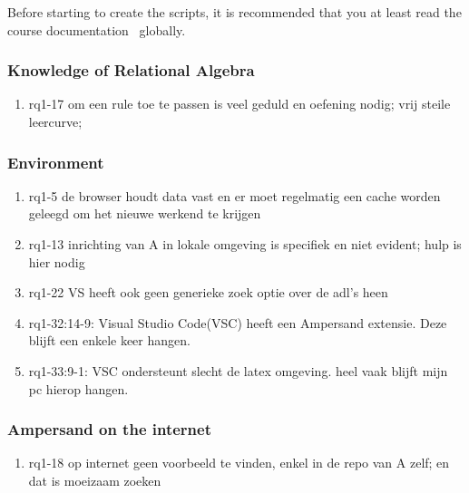 Before starting to create the scripts, it is recommended that you at least read the course documentation~ globally.



\subsubsection{Knowledge of Relational Algebra}
\begin{comment}
plaats hier de afgehandelde items.
\end{comment}

\begin{enumerate}
    \item rq1-17 om een rule toe te passen is veel geduld en oefening nodig; vrij steile leercurve; 
\end{enumerate}

\subsubsection{Environment}
\begin{comment}
plaats hier de afgehandelde items.
\end{comment}
\begin{enumerate}
    \item rq1-5 de browser houdt data vast en er moet regelmatig een cache worden geleegd om het nieuwe werkend te krijgen
    \item rq1-13 inrichting van A in lokale omgeving is specifiek en niet evident; hulp is hier nodig    
    \item rq1-22 VS heeft ook geen generieke zoek optie over de adl's heen
    \item rq1-32:14-9: Visual Studio Code(VSC) heeft een Ampersand extensie. Deze blijft een enkele keer hangen.
    \item rq1-33:9-1: VSC ondersteunt slecht de latex omgeving. heel vaak blijft mijn pc hierop hangen.  

\end{enumerate}

\subsubsection{Ampersand on the internet}
\begin{comment}
plaats hier de afgehandelde items.
\end{comment}
\begin{enumerate}
    \item rq1-18 op internet geen voorbeeld te vinden, enkel in de repo van A zelf; en dat is moeizaam zoeken    
\end{enumerate}

